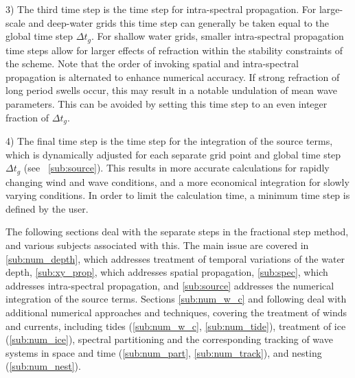 \begin{list}{xx}{\itemsep 0mm \parsep 0mm \rightmargin 5mm}
\item[3)] The third time step is the time step for intra-spectral
propagation. For large-scale and deep-water grids this time step can generally
be taken equal to the global time step $\Delta t_g$. For shallow water grids,
smaller intra-spectral propagation time steps allow for larger effects of
refraction within the stability constraints of the scheme. Note that the order
of invoking spatial and intra-spectral propagation is alternated to enhance
numerical accuracy. If strong refraction of long period swells occur, this may
result in a notable undulation of mean wave parameters. This can be avoided by
setting this time step to an even integer fraction of $\Delta t_g$.

\item[4)] The final time step is the time step for the integration of the
source terms, which is dynamically adjusted for each separate grid point and
global time step $\Delta t_g$ (see \para~\ref{sub:source}). This results in
more accurate calculations for rapidly changing wind and wave conditions, and
a more economical integration for slowly varying conditions. In order to limit the 
calculation time, a minimum time step is defined by the user. 

\end{list}

\vspace{\baselineskip} \noindent 

The following sections deal with the separate steps in the fractional step
method, and various subjects associated with this.  The main issue are covered
in \para\ref{sub:num_depth}, which addresses treatment of temporal variations
of the water depth, \para\ref{sub:xy_prop}, which addresses spatial
propagation, \para\ref{sub:spec}, which addresses intra-spectral propagation,
and \para\ref{sub:source} addresses the numerical integration of the source
terms.  Sections \ref{sub:num_w_c} and following deal with additional
numerical approaches and techniques, covering the treatment of winds and
currents, including tides (\ref{sub:num_w_c}, \ref{sub:num_tide}), treatment
of ice (\ref{sub:num_ice}), spectral partitioning and the corresponding
tracking of wave systems in space and time (\ref{sub:num_part},
\ref{sub:num_track}), and nesting (\ref{sub:num_nest}).
